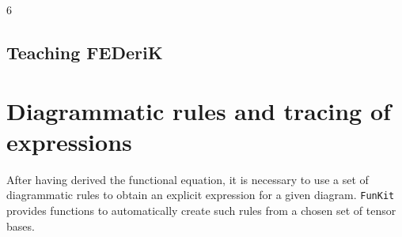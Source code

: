 6\documentclass[10pt,prd,nofootinbib,superscriptaddress,twocolumn]{revtex4-2}
\newcommand{\FunKit}{\texttt{FunKit}\xspace}
\begin{document}
\subsection{Teaching FEDeriK}
\label{sec:FEDeriK_teaching}


\section{Diagrammatic rules and tracing of expressions}
\label{sec:DiRK}

After having derived the functional equation, it is necessary to use a set of diagrammatic rules to obtain an explicit expression for a given diagram. \FunKit provides functions to automatically create such rules from a chosen set of tensor bases.
\end{document}
